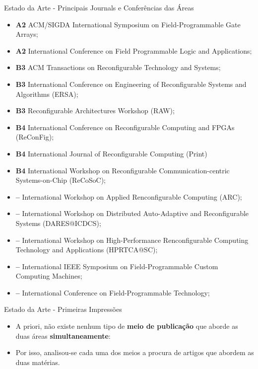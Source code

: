 \documentclass[aspectratio=169]{beamer}
\begin{document}
\begin{frame}{Estado da Arte - Principais Journals e Conferências das Áreas}
	
	{\it \scriptsize 
		\begin{itemize}
         \item \textbf{A2} ACM/SIGDA International Symposium on Field-Programmable Gate Arrays;
         \item \textbf{A2} International Conference on Field Programmable Logic and Applications;
         \item \textbf{B3} ACM Transactions on Reconfigurable Technology and Systems;
         \item \textbf{B3} International Conference on Engineering of Reconfigurable Systems and Algorithms (ERSA);
         \item \textbf{B3} Reconfigurable Architectures Workshop (RAW);
         \item \textbf{B4} International Conference on Reconfigurable Computing and FPGAs (ReConFig);
         \item \textbf{B4} International Journal of Reconfigurable Computing (Print)
         \item \textbf{B4} International Workshop on Reconfigurable Communication-centric Systems-on-Chip (ReCoSoC);
         \item \textbf{--} International Workshop on Applied Renconfigurable Computing (ARC);
         \item \textbf{--} International Workshop on Distributed Auto-Adaptive and Reconfigurable Systems (DARES@ICDCS);
         \item \textbf{--} International Workshop on High-Performance Renconfigurable Computing Technology and Applications (HPRTCA@SC);
         \item \textbf{--} International IEEE Symposium on Field-Programmable Custom Computing Machines;
         \item \textbf{--} International Conference on Field-Programmable Technology;
		\end{itemize}
	}
\end{frame}


\begin{frame}{Estado da Arte - Primeiras Impressões}
	\begin{itemize}
		\item A priori, não existe nenhum tipo de \textbf{meio de publicação} que aborde as duas áreas \textbf{simultaneamente}:
		
		\item Por isso, analisou-se cada uma dos meios a procura de artigos que abordem as duas matérias.
	\end{itemize}
\end{frame}
\end{document}
